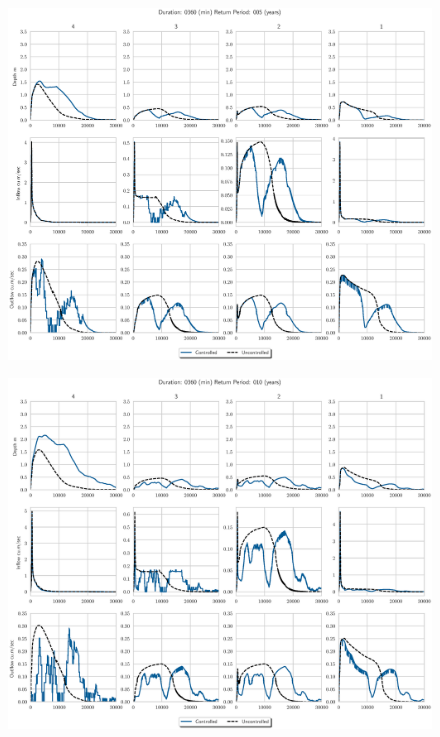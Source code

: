 \begin{figure}
    \centering
    \includegraphics[width=\linewidth]{./RL-SI-figures/77storms/0360005.eps}
\end{figure}
\begin{figure}
    \centering
    \includegraphics[width=\linewidth]{./RL-SI-figures/77storms/0360010.eps}
\end{figure}
